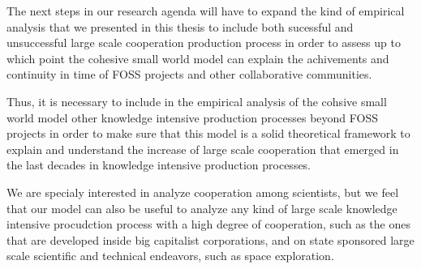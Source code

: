 The next steps in our research agenda will have to expand the kind of empirical analysis that we presented in this thesis to include both sucessful and unsuccessful large scale cooperation production process in order to assess up to which point the cohesive small world model can explain the achivements and continuity in time of FOSS projects and other collaborative communities.

Thus, it is necessary to include in the empirical analysis of the cohsive small world model other knowledge intensive production processes beyond FOSS projects in order to make sure that this model is a solid theoretical framework to explain and understand the increase of large scale cooperation that emerged in the last decades in knowledge intensive production processes.

We are specialy interested in analyze cooperation among scientists, but we feel that our model can also be useful to analyze any kind of large scale knowledge intensive procudction process with a high degree of cooperation, such as the ones that are developed inside big capitalist corporations, and on state sponsored large scale scientific and technical endeavors, such as space exploration.

